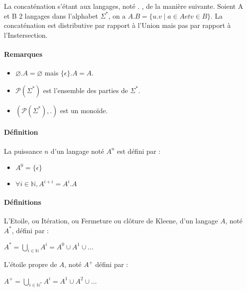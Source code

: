 La concaténation s'étant aux langages, noté . , de la manière suivante. Soient A et B 2 langages dans l'alphabet $\Sigma^*$, on a $A.B=\{u.v \mid a \in A et v \in B\}$. La concaténation est distributive par rapport à l'Union mais pas par rapport à l'Instersection. 



\paragraph{Remarques} %
\label{par:remarques}

\begin{itemize}
	\item $\varnothing.A=\varnothing$ mais $\{\epsilon\}.A=A$.
	\item $\mathcal{P}(\Sigma^*)$ est l'ensemble des parties de $\Sigma^*$.
	\item $(\mathcal{P}(\Sigma^*),.)$ est un monoïde.
\end{itemize}



\paragraph{Définition} %
\label{par:d_finition}

La puissance $n$ d'un langage noté $A^n$ est défini par :
\begin{itemize}
	\item $A^0=\{\epsilon\}$
	\item $\forall i \in \mathbb{N}, A^{i+i}=A^i.A$
\end{itemize}



\paragraph{Définitions} %
\label{par:d_finitions}

L'Etoile, ou Itération, ou Fermeture ou clôture de Kleene, d'un langage $A$, noté $A^*$, défini par :

$A^* = \bigcup\limits_{i \in \mathbb{N}} A^i = A^0 \cup A^1 \cup ...$

L'étoile propre de $A$, noté $A^+$ défini par :

$A^+ = \bigcup\limits_{i\in \mathbb{N^*}} A^i = A^1 \cup A^2 \cup ...$



